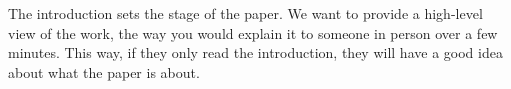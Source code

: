 The introduction sets the stage of the paper.
We want to provide a high-level view of the work, the way you would explain it to someone in person over a few minutes.
This way, if they only read the introduction, they will have a good idea about what the paper is about.

